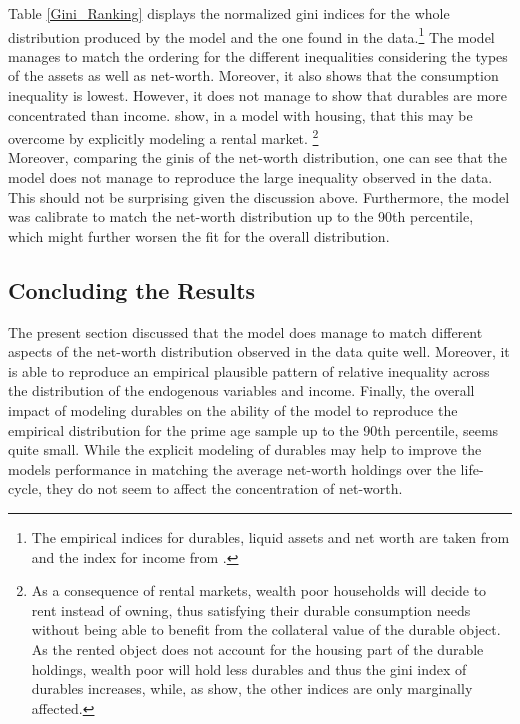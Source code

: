 \documentclass[12pt,a4paper,leqno]{article}
\theoremstyle{definition}
\begin{document}
Table \ref{Gini_Ranking} displays the normalized \citep{chen1982} gini indices for the whole distribution produced by the model and the one found in the data.\footnote{The empirical indices for durables, liquid assets and net worth are taken from \cite{hintermaier2010} and the index for income from \cite{hintermaier2011}.} The model manages to match the ordering for the different inequalities considering the types of the assets as well as net-worth. Moreover, it also shows that the consumption inequality is lowest. However, it does not manage to show that durables are more concentrated than income. \cite{diaz2010} show, in a model with housing, that this may be overcome by explicitly modeling a rental market. \footnote{As a consequence of rental markets, wealth poor households will decide to rent instead of owning, thus satisfying their durable consumption needs without being able to benefit from the collateral value of the durable object. As the rented object does not account for the housing part of the durable holdings, wealth poor will hold less durables and thus the gini index of durables increases, while, as \cite{diaz2010} show, the other indices are only marginally affected.} \\
Moreover, comparing the ginis of the net-worth distribution, one can see that the model does not manage to reproduce the large inequality observed in the data. This should not be surprising given the discussion above. Furthermore, the model was calibrate to match the net-worth distribution up to the 90th percentile, which might further worsen the fit for the overall distribution.  

\subsection{Concluding the Results}
The present section discussed that the model does manage to match different aspects of the net-worth distribution observed in the data quite well. Moreover, it is able to reproduce an empirical plausible pattern of relative inequality across the distribution of the endogenous variables and income. Finally, the overall impact of modeling durables on the ability of the model to reproduce the empirical distribution for the prime age sample up to the 90th percentile, seems quite small. While the explicit modeling of durables may help to improve the models performance in matching the average net-worth holdings over the life-cycle, they do not seem to affect the concentration of net-worth.
\end{document}
